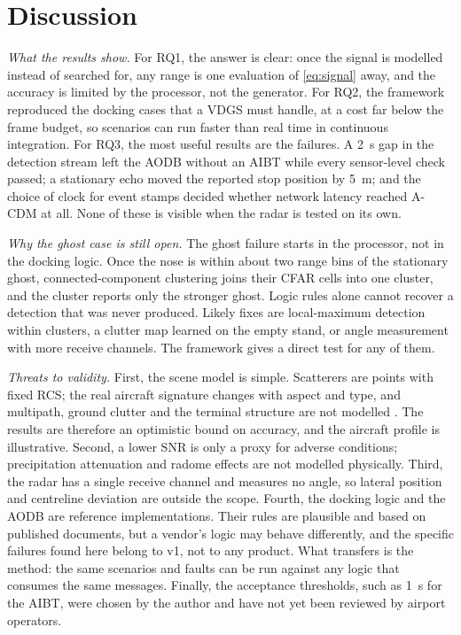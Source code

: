 \documentclass[conference]{IEEEtran}
\begin{document}
\section{Discussion}
\label{sec:discussion}

\emph{What the results show.} For RQ1, the answer is clear: once the signal is modelled instead of searched for, any range is one evaluation of \cref{eq:signal} away, and the accuracy is limited by the processor, not the generator. For RQ2, the framework reproduced the docking cases that a VDGS must handle, at a cost far below the frame budget, so scenarios can run faster than real time in continuous integration. For RQ3, the most useful results are the failures. A \SI{2}{\second} gap in the detection stream left the AODB without an AIBT while every sensor-level check passed; a stationary echo moved the reported stop position by \SI{5}{\metre}; and the choice of clock for event stamps decided whether network latency reached A-CDM at all. None of these is visible when the radar is tested on its own.

\emph{Why the ghost case is still open.} The ghost failure starts in the processor, not in the docking logic. Once the nose is within about two range bins of the stationary ghost, connected-component clustering joins their CFAR cells into one cluster, and the cluster reports only the stronger ghost. Logic rules alone cannot recover a detection that was never produced. Likely fixes are local-maximum detection within clusters, a clutter map learned on the empty stand, or angle measurement with more receive channels. The framework gives a direct test for any of them.

\emph{Threats to validity.} First, the scene model is simple. Scatterers are points with fixed RCS; the real aircraft signature changes with aspect and type, and multipath, ground clutter and the terminal structure are not modelled \cite{holder2018challenges}. The results are therefore an optimistic bound on accuracy, and the aircraft profile is illustrative. Second, a lower SNR is only a proxy for adverse conditions; precipitation attenuation and radome effects are not modelled physically. Third, the radar has a single receive channel and measures no angle, so lateral position and centreline deviation are outside the scope. Fourth, the docking logic and the AODB are reference implementations. Their rules are plausible and based on published documents, but a vendor's logic may behave differently, and the specific failures found here belong to v1, not to any product. What transfers is the method: the same scenarios and faults can be run against any logic that consumes the same messages. Finally, the acceptance thresholds, such as \SI{1}{\second} for the AIBT, were chosen by the author and have not yet been reviewed by airport operators.
\end{document}

